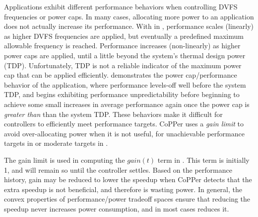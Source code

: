 Applications exhibit different performance behaviors when controlling DVFS frequencies or power caps.
In many cases, allocating more power to an application does not actually increase its performance. %
With  in , performance scales (linearly) as higher DVFS frequencies are applied, but eventually a predefined maximum allowable frequency is reached.
Performance increases (non-linearly) as higher power caps are applied, until a little beyond the system's thermal design power (TDP).
Unfortunately, TDP is not a reliable indicator of the maximum power cap that can be applied efficiently.
 demonstrates the power cap/performance behavior of the  application,
where performance levels-off well before the system TDP, and begins exhibiting
performance unpredictability before beginning to achieve some small increases in average performance again once the power cap is \emph{greater than} than the system TDP.
These behaviors make it difficult for controllers to efficiently meet performance targets.
CoPPer uses a \emph{gain limit} to avoid over-allocating power when it is not useful, \eg for unachievable performance targets in  or moderate targets in .

The gain limit is used in computing the $gain(t)$ term in .
This term is initially 1, and will remain so until the controller settles.  Based on the performance history, gain may be reduced to lower the speedup when CoPPer detects that the extra speedup is not beneficial, and therefore is wasting power.
In general, the convex properties of performance/power tradeoff spaces ensure that reducing the speedup never increases power consumption, and in most cases reduces it.

